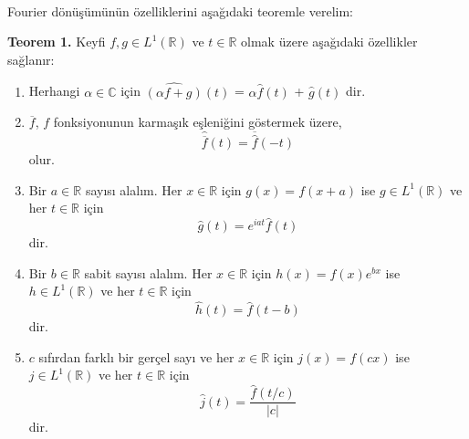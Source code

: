 \documentclass[a4paper, 9pt]{article}
\begin{document}
\paragraph{} Fourier dönüşümünün özelliklerini aşağıdaki teoremle verelim:

\textbf{Teorem 1.} Keyfi $f, g \in L^1(\mathbb{R})$ ve $t\in \mathbb{R}$ olmak üzere aşağıdaki özellikler sağlanır:

\begin{enumerate}
\item Herhangi $\alpha \in \mathbb{C}$ için $\widehat{(\alpha f+g)}(t)$ = $\alpha \widehat{f}(t)$ + $\widehat{g}(t)$ dir.
\item  $\overline{f}$, $f$ fonksiyonunun karmaşık eşleniğini göstermek üzere,
\[ \widehat{\overline{f}}(t) = \overline{\widehat{f}}(-t) \]
olur.
\item  Bir $a \in \mathbb{R}$  sayısı alalım. Her $x\in \mathbb{R}$  için $g(x)=f(x+a)$ ise $g\in L^1(\mathbb{R})$ ve her $t\in \mathbb{R}$ için 
\[ \widehat{g}(t) = e^{iat}\widehat{f}(t)\]
dir.
\item Bir $b\in \mathbb{R}$ sabit sayısı alalım. Her $x\in \mathbb{R}$ için $h(x)=f(x)e^{bx}$ ise $h\in L^1(\mathbb{R})$ ve her $t\in \mathbb{R}$ için
\[ \widehat{h}(t) = \widehat{f}(t-b) \]
dir.
\item $c$ sıfırdan farklı bir gerçel sayı ve her $x \in \mathbb{R}$ için $j(x)=f(cx)$ ise $j\in L^1(\mathbb{R})$ ve her $t\in \mathbb{R}$ için
\[ \widehat{j}(t)=\frac{\widehat{f}(t/c)}{\left |  c \right |} \] dir.

\end{enumerate}
\end{document}
